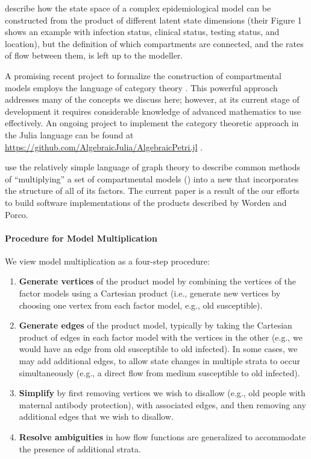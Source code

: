 \cite{friston2020dynamic} describe how the state space of a complex epidemiological model can be constructed from the product of different latent state dimensions (their Figure 1 shows an example with infection status, clinical status, testing status, and location), but the definition of which compartments are connected, and the rates of flow between them, is left up to the modeller.

A promising recent project to formalize the construction of compartmental models employs the language of category theory \citep{fong2018seven, Libkind2022an, libkind2021operadic, baez2023categorical, baez2017compositional}. This powerful approach addresses many of the concepts we discuss here; however, at its current stage of development it requires considerable knowledge of advanced mathematics to use effectively.  An ongoing project to implement the category theoretic approach in the Julia language can be found at \url{https://github.com/AlgebraicJulia/AlgebraicPetri.jl} \citep{algebraicjulia}. 

\cite{worden2017products} use the relatively simple language of graph theory to describe common methods of “multiplying” a set of compartmental models () into a new  that incorporates the structure of all of its factors. The current paper is a result of the our efforts to build software implementations of the products described by Worden and Porco. 

\paragraph{Procedure for Model Multiplication}\label{genproc}

We view model multiplication as a four-step procedure:

\begin{enumerate}
    \item \textbf{Generate vertices} of the product model by combining the vertices of the factor models using a Cartesian product (i.e., generate new vertices by choosing one vertex from each factor model, e.g., old susceptible).
    \item \textbf{Generate edges} of the product model, typically by taking the Cartesian product of edges in each factor model with the vertices in the other (e.g., we would have an edge from old susceptible to old infected). In some cases, we may add additional edges, to allow state changes in multiple strata to occur simultaneously (e.g., a direct flow from medium susceptible to old infected).
	 \item \textbf{Simplify} by first removing vertices we wish to disallow (e.g., old people with maternal antibody protection), with associated edges, and then removing any additional edges that we wish to disallow.
    \item \textbf{Resolve ambiguities} in how flow functions are generalized to accommodate the presence of additional strata.
\end{enumerate}


